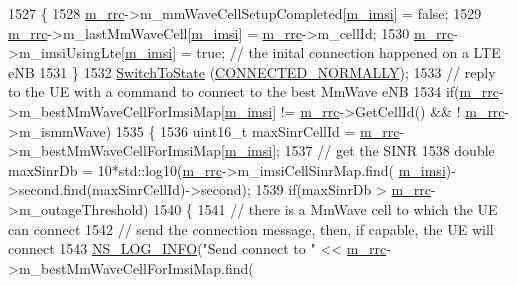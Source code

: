 \begin{DoxyCode}
1527       \{
1528         \hyperlink{classns3_1_1UeManager_ab4405e9f354c66e7c1a4c95832290f5b}{m\_rrc}->m\_mmWaveCellSetupCompleted[\hyperlink{classns3_1_1UeManager_a868dda076ecfc1d4202e357c16223d84}{m\_imsi}] = \textcolor{keyword}{false};
1529         \hyperlink{classns3_1_1UeManager_ab4405e9f354c66e7c1a4c95832290f5b}{m\_rrc}->m\_lastMmWaveCell[\hyperlink{classns3_1_1UeManager_a868dda076ecfc1d4202e357c16223d84}{m\_imsi}] = \hyperlink{classns3_1_1UeManager_ab4405e9f354c66e7c1a4c95832290f5b}{m\_rrc}->m\_cellId;
1530         \hyperlink{classns3_1_1UeManager_ab4405e9f354c66e7c1a4c95832290f5b}{m\_rrc}->m\_imsiUsingLte[\hyperlink{classns3_1_1UeManager_a868dda076ecfc1d4202e357c16223d84}{m\_imsi}] = \textcolor{keyword}{true}; \textcolor{comment}{// the inital connection happened on a LTE eNB}
1531       \}
1532       \hyperlink{classns3_1_1UeManager_af2b5ad90fc6f16ffc4a91fbe8a522472}{SwitchToState} (\hyperlink{classns3_1_1UeManager_a2f4085fdd18d7125c27da44a5b8b6808a2a1020dce30f19aa9354ba34b2e7c5e0}{CONNECTED\_NORMALLY});
1533       \textcolor{comment}{// reply to the UE with a command to connect to the best MmWave eNB}
1534       \textcolor{keywordflow}{if}(\hyperlink{classns3_1_1UeManager_ab4405e9f354c66e7c1a4c95832290f5b}{m\_rrc}->m\_bestMmWaveCellForImsiMap[\hyperlink{classns3_1_1UeManager_a868dda076ecfc1d4202e357c16223d84}{m\_imsi}] != \hyperlink{classns3_1_1UeManager_ab4405e9f354c66e7c1a4c95832290f5b}{m\_rrc}->GetCellId() && !
      \hyperlink{classns3_1_1UeManager_ab4405e9f354c66e7c1a4c95832290f5b}{m\_rrc}->m\_ismmWave)
1535       \{ 
1536         uint16\_t maxSinrCellId = \hyperlink{classns3_1_1UeManager_ab4405e9f354c66e7c1a4c95832290f5b}{m\_rrc}->m\_bestMmWaveCellForImsiMap[\hyperlink{classns3_1_1UeManager_a868dda076ecfc1d4202e357c16223d84}{m\_imsi}];
1537         \textcolor{comment}{// get the SINR}
1538         \textcolor{keywordtype}{double} maxSinrDb = 10*std::log10(\hyperlink{classns3_1_1UeManager_ab4405e9f354c66e7c1a4c95832290f5b}{m\_rrc}->m\_imsiCellSinrMap.find(
      \hyperlink{classns3_1_1UeManager_a868dda076ecfc1d4202e357c16223d84}{m\_imsi})->second.find(maxSinrCellId)->second);
1539         \textcolor{keywordflow}{if}(maxSinrDb > \hyperlink{classns3_1_1UeManager_ab4405e9f354c66e7c1a4c95832290f5b}{m\_rrc}->m\_outageThreshold)
1540         \{
1541           \textcolor{comment}{// there is a MmWave cell to which the UE can connect}
1542           \textcolor{comment}{// send the connection message, then, if capable, the UE will connect }
1543           \hyperlink{group__logging_gafbd73ee2cf9f26b319f49086d8e860fb}{NS\_LOG\_INFO}(\textcolor{stringliteral}{"Send connect to "} << \hyperlink{classns3_1_1UeManager_ab4405e9f354c66e7c1a4c95832290f5b}{m\_rrc}->m\_bestMmWaveCellForImsiMap.find(

\end{DoxyCode}
